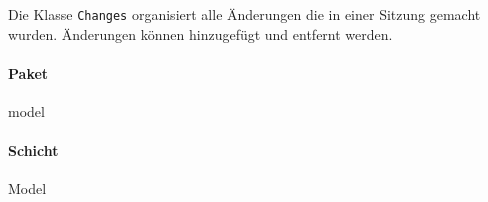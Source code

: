 Die Klasse \verb#Changes# organisiert alle Änderungen die in einer Sitzung gemacht wurden.
Änderungen können hinzugefügt und entfernt werden.

\paragraph*{Paket}
model

\paragraph*{Schicht}
Model